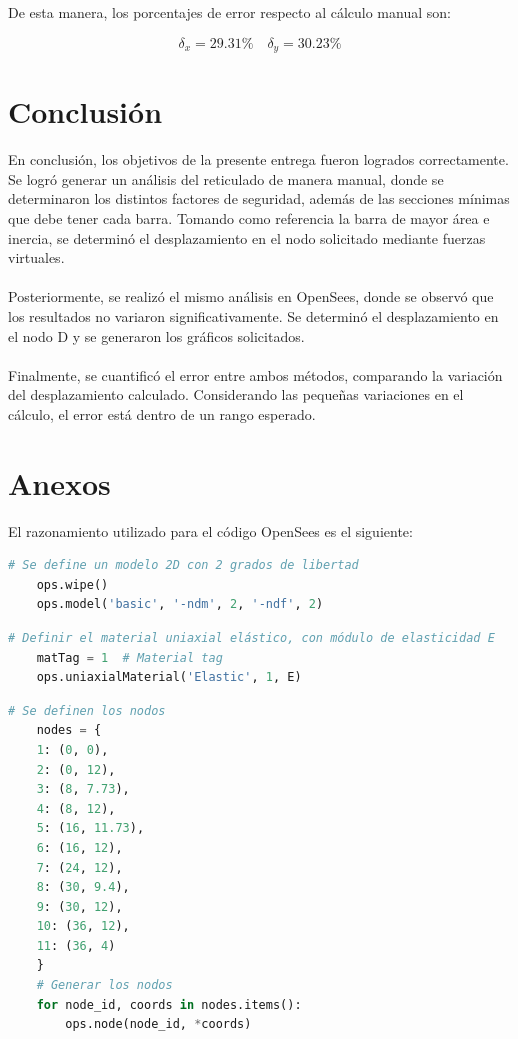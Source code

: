 De esta manera, los porcentajes de error respecto al cálculo manual son:

\begin{equation}
    \delta_x = 29.31\% \quad \delta_y = 30.23\%
\end{equation}

\section{Conclusión}

En conclusión, los objetivos de la presente entrega fueron logrados correctamente. Se logró generar un análisis del reticulado de manera manual, donde se determinaron los distintos factores de seguridad, además de las secciones mínimas que debe tener cada barra. Tomando como referencia la barra de mayor área e inercia, se determinó el desplazamiento en el nodo solicitado mediante fuerzas virtuales.
\\ \\
Posteriormente, se realizó el mismo análisis en OpenSees, donde se observó que los resultados no variaron significativamente. Se determinó el desplazamiento en el nodo D y se generaron los gráficos solicitados.
\\ \\
Finalmente, se cuantificó el error entre ambos métodos, comparando la variación del desplazamiento calculado. Considerando las pequeñas variaciones en el cálculo, el error está dentro de un rango esperado.


\newpage
\section{Anexos}

El razonamiento utilizado para el código OpenSees es el siguiente:

\begin{lstlisting}[language=Python]
    # Se define un modelo 2D con 2 grados de libertad
    ops.wipe()
    ops.model('basic', '-ndm', 2, '-ndf', 2)
\end{lstlisting}

\begin{lstlisting}[language=Python]
    # Definir el material uniaxial elástico, con módulo de elasticidad E
    matTag = 1  # Material tag
    ops.uniaxialMaterial('Elastic', 1, E)
\end{lstlisting}

\begin{lstlisting}[language=Python]
    # Se definen los nodos
    nodes = {
    1: (0, 0),
    2: (0, 12),
    3: (8, 7.73),
    4: (8, 12),
    5: (16, 11.73),
    6: (16, 12),
    7: (24, 12),
    8: (30, 9.4),
    9: (30, 12),
    10: (36, 12),
    11: (36, 4)
    }
    # Generar los nodos
    for node_id, coords in nodes.items():
        ops.node(node_id, *coords)
\end{lstlisting}

